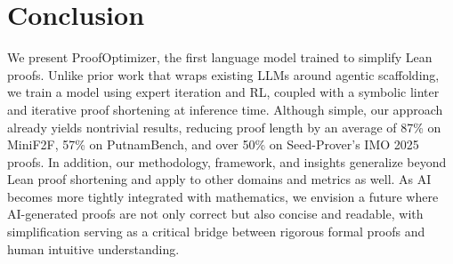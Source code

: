 \section{Conclusion}
We present ProofOptimizer, the first language model trained to simplify Lean proofs. 
Unlike prior work that wraps existing LLMs around agentic scaffolding, we train a model using expert iteration and RL, coupled with a symbolic linter and iterative proof shortening at inference time. 
Although simple, our approach already yields nontrivial results, reducing proof length by an average of 87\% on MiniF2F, 57\% on PutnamBench, and over 50\% on Seed-Prover’s IMO 2025 proofs. 
In addition, our methodology, framework, and insights generalize beyond Lean proof shortening and apply to other domains and metrics as well. As AI becomes more tightly integrated with mathematics, we envision a future where AI-generated proofs are not only correct but also concise and readable, with simplification serving as a critical bridge between rigorous formal proofs and human intuitive understanding.